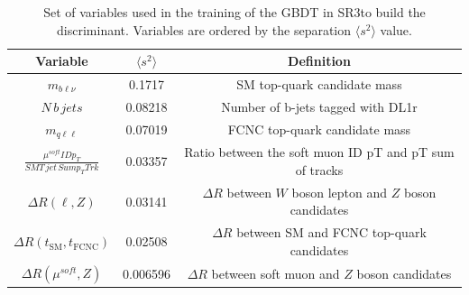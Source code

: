 \begin{table}[!htbp]
	\small
	\centering
	\begin{tabular}{ccc}
		\toprule
		Variable & $\langle s^{2}\rangle$  & Definition \\
		\midrule
		$m_{b\ell\nu}$  &  0.1717  &  SM top-quark candidate mass  \\
		$N\,b\,jets$  &  0.08218  &  Number of b-jets tagged with DL1r  \\
		$m_{q\ell\ell}$  &  0.07019  &  FCNC top-quark candidate mass  \\
		$\frac{\mu^{soft} ID p_{T}}{SMT\,jet\,Sum p_{T} Trk}$  &  0.03357  &  Ratio between the soft muon ID pT and pT sum of tracks  \\
		$\Delta R(\ell,Z)$  &  0.03141  &  $\Delta R$ between $W$ boson lepton and $Z$ boson candidates  \\
		$\Delta R(t_{\text{SM}},t_{\text{FCNC}})$  &  0.02508  &  $\Delta R$ between SM and FCNC top-quark candidates  \\
		$\Delta R(\mu^{soft},Z)$  &  0.006596  &  $\Delta R$ between soft muon and $Z$ boson candidates  \\
		\bottomrule
	\end{tabular}
	\caption{
	Set of variables used in the training of the GBDT in SR3\tZc to build the \Dthree discriminant. Variables are ordered by the separation $\langle s^{2}\rangle$ value. }
	\label{tab:D3input}
\end{table}

